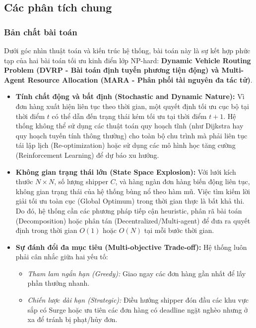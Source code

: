 \documentclass[conference]{IEEEtran}
\begin{document}
\subsection{Các phân tích chung}
\subsubsection{Bản chất bài toán}
Dưới góc nhìn thuật toán và kiến trúc hệ thống, bài toán này là sự kết hợp phức tạp của hai bài toán tối ưu kinh điển lớp NP-hard: \textbf{Dynamic Vehicle Routing Problem (DVRP - Bài toán định tuyến phương tiện động) và Multi-Agent Resource Allocation (MARA - Phân phối tài nguyên đa tác tử)}.

\begin{itemize}
    \item \textbf{Tính chất động và bất định (Stochastic and Dynamic Nature):} Vì đơn hàng xuất hiện liên tục theo thời gian, một quyết định tối ưu cục bộ tại thời điểm $t$ có thể dẫn đến trạng thái kém tối ưu tại thời điểm $t+1$. Hệ thống không thể sử dụng các thuật toán quy hoạch tĩnh (như Dijkstra hay quy hoạch tuyến tính thông thường) cho toàn bộ chu trình mà phải liên tục tái lập lịch (Re-optimization) hoặc sử dụng các mô hình học tăng cường (Reinforcement Learning) để dự báo xu hướng.
    \item \textbf{Không gian trạng thái lớn (State Space Explosion):} Với lưới kích thước $N \times N$, số lượng shipper $C$, và hàng ngàn đơn hàng biến động liên tục, không gian trạng thái của hệ thống bùng nổ theo hàm mũ. Việc tìm kiếm lời giải tối ưu toàn cục (Global Optimum) trong thời gian thực là bất khả thi. Do đó, hệ thống cần các phương pháp tiếp cận heuristic, phân rã bài toán (Decomposition) hoặc phân tán (Decentralized/Multi-agent) để đưa ra quyết định trong thời gian $O(1)$ hoặc $O(N)$ tại mỗi bước thời gian.
    \item \textbf{Sự đánh đổi đa mục tiêu (Multi-objective Trade-off):} Hệ thống luôn phải cân nhắc giữa hai yếu tố:
        \begin{itemize}
        \item \textit{Tham lam ngắn hạn (Greedy):} Giao ngay các đơn hàng gần nhất để lấy phần thưởng nhanh.
        \item \textit{Chiến lược dài hạn (Strategic):} Điều hướng shipper đón đầu các khu vực sắp có Surge hoặc ưu tiên các đơn hàng có deadline ngặt nghèo nhưng ở xa để tránh bị phạt/hủy đơn.
        \end{itemize}
\end{itemize}
\end{document}
